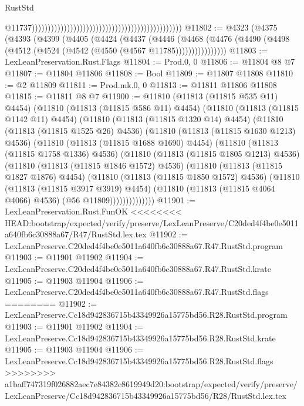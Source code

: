 \begin{lexlean}{RustStd}
\begin{coremodule}
{\begin{coremodule}
{{{{{{{{{{{{{{{{{{{{{{{{{{{{{{{{{{{{{{{{{{{{{{{{{{{{{{{{{{{{{{{{{{{{{{{{{{{{{{{{                                                                                                  @11737)))))))))))))))))))))))))))))))))))))))))))))))
@11802 := @4323
    (@4375
      (@4393
        (@4399
          (@4405
            (@4424
              (@4437
                (@4446
                  (@4468
                    (@4476 (@4490 (@4498 (@4512 (@4524 (@4542 (@4550 (@4567 @11785))))))))))))))))
@11803 := LexLeanPreservation.Rust.Flags
@11804 := Prod.{0, 0}
@11806 := @11804 @8 @7
@11807 := @11804 @11806
@11808 := Bool
@11809 := @11807 @11808
@11810 := @2 @11809
@11811 := Prod.mk.{0, 0}
@11813 := @11811 @11806 @11808
@11815 := @11811 @8 @7
@11900 := @11810
    (@11813 (@11815 @535 @11) @4454)
    (@11810
      (@11813 (@11815 @586 @11) @4454)
      (@11810
        (@11813 (@11815 @1142 @11) @4454)
        (@11810
          (@11813 (@11815 @1320 @14) @4454)
          (@11810
            (@11813 (@11815 @1525 @26) @4536)
            (@11810
              (@11813 (@11815 @1630 @1213) @4536)
              (@11810
                (@11813 (@11815 @1688 @1690) @4454)
                (@11810
                  (@11813 (@11815 @1758 @1336) @4536)
                  (@11810
                    (@11813 (@11815 @1805 @1213) @4536)
                    (@11810
                      (@11813 (@11815 @1846 @1572) @4536)
                      (@11810
                        (@11813 (@11815 @1827 @1876) @4454)
                        (@11810
                          (@11813 (@11815 @1850 @1572) @4536)
                          (@11810
                            (@11813 (@11815 @3917 @3919) @4454)
                            (@11810 (@11813 (@11815 @4064 @4066) @4536) (@56 @11809))))))))))))))
@11901 := LexLeanPreservation.Rust.FunOK
<<<<<<<< HEAD:bootstrap/expected/verify/preserve/LexLeanPreserve/C20ded4f4be0e5011a640fb6c30888a67/R47/RustStd.lex.tex
@11902 := LexLeanPreserve.C20ded4f4be0e5011a640fb6c30888a67.R47.RustStd.program
@11903 := @11901 @11902
@11904 := LexLeanPreserve.C20ded4f4be0e5011a640fb6c30888a67.R47.RustStd.krate
@11905 := @11903 @11904
@11906 := LexLeanPreserve.C20ded4f4be0e5011a640fb6c30888a67.R47.RustStd.flags
========
@11902 := LexLeanPreserve.Cc18d942836715b43349926a15775bd56.R28.RustStd.program
@11903 := @11901 @11902
@11904 := LexLeanPreserve.Cc18d942836715b43349926a15775bd56.R28.RustStd.krate
@11905 := @11903 @11904
@11906 := LexLeanPreserve.Cc18d942836715b43349926a15775bd56.R28.RustStd.flags
>>>>>>>> a1baff747319f026882aec7e84382c8619949d20:bootstrap/expected/verify/preserve/LexLeanPreserve/Cc18d942836715b43349926a15775bd56/R28/RustStd.lex.tex
}}}}}}}}}}}}}}}}}}}}}}}}}}}}}}}}}}}}}}}}}}}}}}}}}}}}}}}}}}}}}}}}}}}}}}}}}}}}}}}}
\end{coremodule}}
\end{coremodule}
\end{lexlean}
